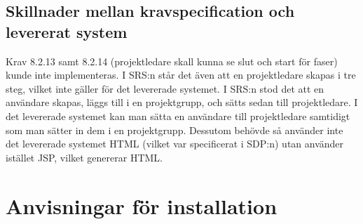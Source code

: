 \documentclass[paper=a4, fontsize=11pt,twoside]{article}
\begin{document}
\subsection{Skillnader mellan kravspecification och levererat system}
Krav 8.2.13 samt 8.2.14 (projektledare skall kunna se slut och start för faser) kunde inte implementeras. I SRS:n står det även att en projektledare skapas i tre steg, vilket inte gäller för det levererade systemet. I SRS:n stod det att en användare skapas, läggs till i en projektgrupp, och sätts sedan till projektledare. I det levererade systemet kan man sätta en användare till projektledare samtidigt som man sätter in dem i en projektgrupp. Dessutom behövde så använder inte det levererade systemet HTML (vilket var specificerat i SDP:n) utan använder istället JSP, vilket genererar HTML. 
\section{Anvisningar för installation}
\end{document}

